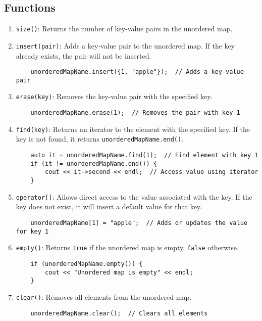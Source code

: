 \documentclass{article}
\begin{document}
\subsection{Functions}

\begin{enumerate}
    \item \texttt{size()}: Returns the number of key-value pairs in the unordered map.
    \item \texttt{insert(pair)}: Adds a key-value pair to the unordered map. If the key already exists, the pair will not be inserted.
    \begin{lstlisting}
    unorderedMapName.insert({1, "apple"});  // Adds a key-value pair
    \end{lstlisting}
    \item \texttt{erase(key)}: Removes the key-value pair with the specified key.
    \begin{lstlisting}
    unorderedMapName.erase(1);  // Removes the pair with key 1
    \end{lstlisting}
    \item \texttt{find(key)}: Returns an iterator to the element with the specified key. If the key is not found, it returns \texttt{unorderedMapName.end()}.
    \begin{lstlisting}
    auto it = unorderedMapName.find(1);  // Find element with key 1
    if (it != unorderedMapName.end()) {
        cout << it->second << endl;  // Access value using iterator
    }
    \end{lstlisting}
    \item \texttt{operator[]}: Allows direct access to the value associated with the key. If the key does not exist, it will insert a default value for that key.
    \begin{lstlisting}
    unorderedMapName[1] = "apple";  // Adds or updates the value for key 1
    \end{lstlisting}
    \item \texttt{empty()}: Returns \texttt{true} if the unordered map is empty, \texttt{false} otherwise.
    \begin{lstlisting}
    if (unorderedMapName.empty()) {
        cout << "Unordered map is empty" << endl;
    }
    \end{lstlisting}
    \item \texttt{clear()}: Removes all elements from the unordered map.
    \begin{lstlisting}
    unorderedMapName.clear();  // Clears all elements
    \end{lstlisting}
\end{enumerate}
\end{document}
